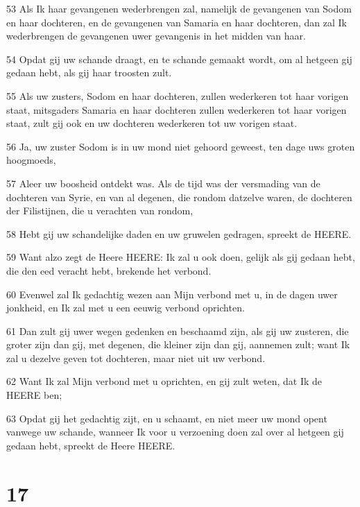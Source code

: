 \par 53 Als Ik haar gevangenen wederbrengen zal, namelijk de gevangenen van Sodom en haar dochteren, en de gevangenen van Samaria en haar dochteren, dan zal Ik wederbrengen de gevangenen uwer gevangenis in het midden van haar.
\par 54 Opdat gij uw schande draagt, en te schande gemaakt wordt, om al hetgeen gij gedaan hebt, als gij haar troosten zult.
\par 55 Als uw zusters, Sodom en haar dochteren, zullen wederkeren tot haar vorigen staat, mitsgaders Samaria en haar dochteren zullen wederkeren tot haar vorigen staat, zult gij ook en uw dochteren wederkeren tot uw vorigen staat.
\par 56 Ja, uw zuster Sodom is in uw mond niet gehoord geweest, ten dage uws groten hoogmoeds,
\par 57 Aleer uw boosheid ontdekt was. Als de tijd was der versmading van de dochteren van Syrie, en van al degenen, die rondom datzelve waren, de dochteren der Filistijnen, die u verachten van rondom,
\par 58 Hebt gij uw schandelijke daden en uw gruwelen gedragen, spreekt de HEERE.
\par 59 Want alzo zegt de Heere HEERE: Ik zal u ook doen, gelijk als gij gedaan hebt, die den eed veracht hebt, brekende het verbond.
\par 60 Evenwel zal Ik gedachtig wezen aan Mijn verbond met u, in de dagen uwer jonkheid, en Ik zal met u een eeuwig verbond oprichten.
\par 61 Dan zult gij uwer wegen gedenken en beschaamd zijn, als gij uw zusteren, die groter zijn dan gij, met degenen, die kleiner zijn dan gij, aannemen zult; want Ik zal u dezelve geven tot dochteren, maar niet uit uw verbond.
\par 62 Want Ik zal Mijn verbond met u oprichten, en gij zult weten, dat Ik de HEERE ben;
\par 63 Opdat gij het gedachtig zijt, en u schaamt, en niet meer uw mond opent vanwege uw schande, wanneer Ik voor u verzoening doen zal over al hetgeen gij gedaan hebt, spreekt de Heere HEERE.

\chapter{17}

